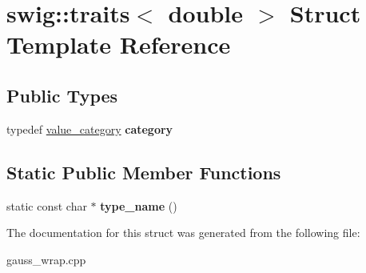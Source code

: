 \hypertarget{structswig_1_1traits_3_01double_01_4}{\section{swig\-:\-:traits$<$ double $>$ Struct Template Reference}
\label{structswig_1_1traits_3_01double_01_4}
}
\subsection*{Public Types}
\begin{DoxyCompactItemize}
\item 
\hypertarget{structswig_1_1traits_3_01double_01_4_a003467ac91b8ca5a649cdf68f82ab7de}{typedef \hyperlink{structswig_1_1value__category}{value\-\_\-category} {\bfseries category}}\label{structswig_1_1traits_3_01double_01_4_a003467ac91b8ca5a649cdf68f82ab7de}

\end{DoxyCompactItemize}
\subsection*{Static Public Member Functions}
\begin{DoxyCompactItemize}
\item 
\hypertarget{structswig_1_1traits_3_01double_01_4_a2474db5e0109bff332ac101c976a8b22}{static const char $\ast$ {\bfseries type\-\_\-name} ()}\label{structswig_1_1traits_3_01double_01_4_a2474db5e0109bff332ac101c976a8b22}

\end{DoxyCompactItemize}


The documentation for this struct was generated from the following file\-:\begin{DoxyCompactItemize}
\item 
gauss\-\_\-wrap.\-cpp\end{DoxyCompactItemize}
